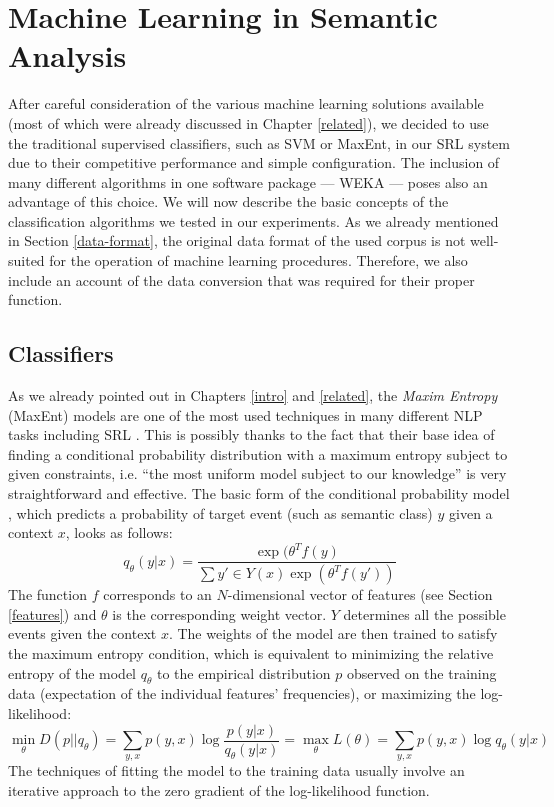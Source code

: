 \documentclass[12pt,notitlepage]{report}
\begin{document}
%
%
\chapter{Machine Learning in Semantic Analysis}\label{ml-semantic}
%
%

After careful consideration of the various machine learning solutions available (most of which were already discussed in Chapter \ref{related}), we decided to use the traditional supervised classifiers, such as SVM or MaxEnt, in our SRL system due to their competitive performance and simple configuration. The inclusion of many different algorithms in one software package --- WEKA --- poses also an advantage of this choice. We will now describe the basic concepts of the classification algorithms we tested in our experiments. As we already mentioned in Section \ref{data-format}, the original data format of the used corpus is not well-suited for the operation of machine learning procedures. Therefore, we also include an account of the data conversion that was required for their proper function.

\section{Classifiers}\label{classifiers}

As we already pointed out in Chapters \ref{intro} and \ref{related}, the \emph{Maxim Entropy} (MaxEnt) models \citep[p. 219ff.]{jelinek97} are one of the most used techniques in many different NLP tasks \citep[p. 607f.]{manning00} including SRL \citep{jiang06,zhao09,che09,chen09}. This is possibly thanks to the fact that their base idea of finding a conditional probability distribution with a maximum entropy subject to given constraints, i.e. ``the most uniform model subject to our knowledge'' \citep[p. 41]{berger96} is very straightforward and effective. The basic form of the conditional probability model \citep{malouf02}, which predicts a probability of target event (such as semantic class) $y$ given a context $x$, looks as follows: 
\begin{equation}
q_\theta(y|x) = \frac{\exp(\theta^T f(y)}{\sum y'\in Y(x) \exp(\theta^T f(y'))}
\end{equation}
The function $f$ corresponds to an $N$-dimensional vector of features (see Section \ref{features}) and $\theta$ is the corresponding weight vector. $Y$ determines all the possible events given the context $x$. The weights of the model are then trained to satisfy the maximum entropy condition, which is equivalent to minimizing the relative entropy \citep[or Kullback-Leibler Divergence][p. 72]{manning00} of the model $q_\theta$ to the empirical distribution $p$ observed on the training data (expectation of the individual features' frequencies), or maximizing the log-likelihood:
\begin{equation}
\min_\theta D(p||q_\theta) = \sum_{y,x} p(y,x) \log\frac{p(y|x)}{q_\theta(y|x)} = \max_\theta L(\theta) = \sum_{y,x} p(y,x) \log q_\theta(y|x)
\end{equation}
The techniques of fitting the model to the training data usually involve an iterative approach to the zero gradient of the log-likelihood function.
\end{document}
